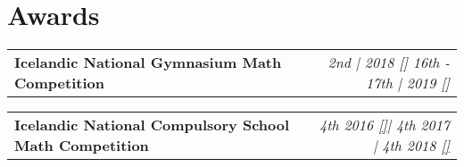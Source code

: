 \documentclass{article}
\makeatletter
\newcommand{\resumeProject}[4]{
\vspace{3mm}
    \begin{tabular*}{0.99\textwidth}[t]{l@{\extracolsep{\fill}}r}
        \textbf{#1} & \textit{\normalsize{#3}} \\
        \normalsize{\textit{#2}} & \normalsize{#4}
    \end{tabular*}
    \vspace{-2mm}
}
\newcommand{\resumeAward}[2]{
\vspace{3mm}
    \begin{tabular*}{0.99\textwidth}[t]{l@{\extracolsep{\fill}}r}
        \textbf{#1} & \textit{\normalsize{#2}} \\
    \end{tabular*}
    \vspace{-2mm}
}
\newcommand{\resumeSubHeadingListStart}{}
\newcommand{\resumeSubHeadingListEnd}{}
\makeatother
\begin{document}
\section{\textbf{Awards}}
\resumeSubHeadingListStart




\resumeAward
  {Icelandic National Gymnasium Math Competition}
  {2nd | 2018 {}[\href{https://www.stae.is/stak/keppnin2018}{\textcolor{black}{\faIcon{globe}}}] \textit{16th - 17th | 2019 {}[\href{https://www.stae.is/stak/keppnin2019}{\textcolor{black}{\faIcon{globe}}}]}}

\resumeAward
	{Icelandic National Compulsory School Math Competition}
	{\textit{4th 2016 \href{http://www.lagafellsskoli.is/forsida/frettir/frett/2016/03/17/Staerdfraedikeppni-grunnskolanna-a-elsta-stigi/}{[\faGlobe]}}| \textit{4th 2017} | \textit{4th 2018 \href{http://www.lagafellsskoli.is/forsida/frettir/frett/2018/04/10/Urslit-staerdfraedikeppni-grunnskolanna-2018/}{[\faGlobe]}}}


\resumeSubHeadingListEnd

%
%
%
\end{document}
